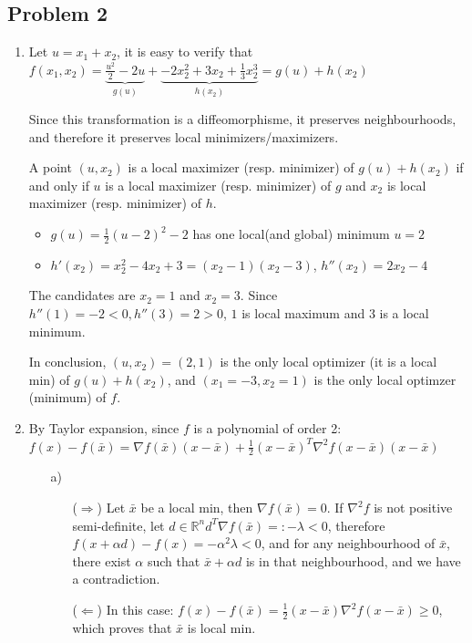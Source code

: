 \documentclass[12pt]{article}
\newcommand{\Problem}[1]{\subsection*{Problem #1}}
\begin{document}
\Problem{2}
\begin{enumerate}
\item
  Let $u = x_1 + x_2$, it is easy to verify that
  $f(x_1, x_2) = \underbrace{\frac {u^2}2 - 2u}_{g(u)} + \underbrace{- 2 x_2^2 + 3 x_2 + \frac13 x_2^3}_{h(x_2)} = g(u) + h(x_2)$

  Since this transformation is a diffeomorphisme, it preserves neighbourhoods, and therefore it preserves local minimizers/maximizers.

  A point $(u, x_2)$ is a local maximizer (resp. minimizer) of $g(u) + h(x_2)$ if and only if $u$ is a local maximizer (resp. minimizer) of $g$ and $x_2$ is local maximizer (resp. minimizer) of $h$.

  \begin{itemize}
  \item $g(u) = \frac12 (u-2)^2 - 2$ has one local(and global) minimum
    $u = 2$
  \item $h'(x_2) = x_2^2 - 4x_2 + 3 = (x_2 - 1)(x_2 - 3)$,
    $h''(x_2) = 2x_2 - 4$ 
  \end{itemize}
  The candidates are $x_2 = 1$ and $x_2 = 3$. Since $h''(1) = -2 < 0, h''(3) = 2 > 0$, $1$ is local maximum and $3$ is a local minimum.

  In conclusion, $(u, x_2) = (2, 1)$ is the only local optimizer (it is a local min) of $g(u) + h(x_2)$, and  $(x_1 = -3, x_2 = 1)$ is the only local optimzer (minimum) of $f$.

\item

  By Taylor expansion, since $f$ is a polynomial of order 2: $f(x) - f(\bar x) = \nabla f(\bar x)(x - \bar x) + \frac12 (x-\bar x)^T \nabla^2 f(x - \bar x) (x-\bar x)$

  \begin{enumerate}
  \item[a)]
  \begin{enumerate}
  \item[($\Rightarrow$)]
    Let $\bar x$ be a local min, then $\nabla f(\bar x) = 0$.
    If $\nabla^2 f$ is not positive semi-definite, let $d \in \mathbb{R}^n d^T\nabla f(\bar x) =: -\lambda < 0$, therefore $f(x + \alpha d) - f(x) = - \alpha^2 \lambda < 0$, and for any neighbourhood of $\bar x$, there exist $\alpha$ such that $\bar x + \alpha d$ is in that neighbourhood, and we have a contradiction.
  \item[($\Leftarrow$)]
    In this case: $f(x) - f(\bar x) = \frac12 (x-\bar x) \nabla^2 f(x - \bar x) \ge 0$, which proves that $\bar x$ is local min.
  \end{enumerate}


\end{enumerate}
\end{enumerate}
\end{document}
